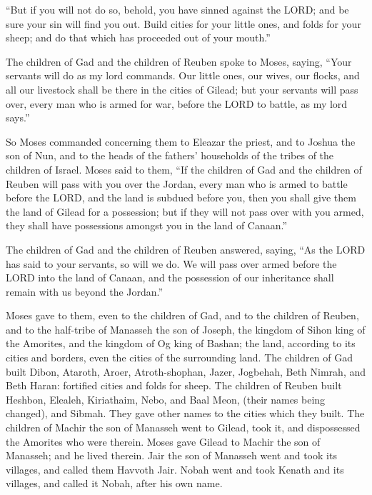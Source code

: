  ``But if you will not do so, behold, you have sinned
against the LORD; and be sure your sin will find you out. 
Build cities for your little ones, and folds for your sheep; and do that
which has proceeded out of your mouth.''

 The children of Gad and the children of Reuben spoke to
Moses, saying, ``Your servants will do as my lord commands.
 Our little ones, our wives, our flocks, and all our
livestock shall be there in the cities of Gilead;  but your
servants will pass over, every man who is armed for war, before the LORD
to battle, as my lord says.''

 So Moses commanded concerning them to Eleazar the priest,
and to Joshua the son of Nun, and to the heads of the fathers'
households of the tribes of the children of Israel.  Moses
said to them, ``If the children of Gad and the children of Reuben will
pass with you over the Jordan, every man who is armed to battle before
the LORD, and the land is subdued before you, then you shall give them
the land of Gilead for a possession;  but if they will not
pass over with you armed, they shall have possessions amongst you in the
land of Canaan.''

 The children of Gad and the children of Reuben answered,
saying, ``As the LORD has said to your servants, so will we do.
 We will pass over armed before the LORD into the land of
Canaan, and the possession of our inheritance shall remain with us
beyond the Jordan.''

 Moses gave to them, even to the children of Gad, and to
the children of Reuben, and to the half-tribe of Manasseh the son of
Joseph, the kingdom of Sihon king of the Amorites, and the kingdom of Og
king of Bashan; the land, according to its cities and borders, even the
cities of the surrounding land.  The children of Gad built
Dibon, Ataroth, Aroer,  Atroth-shophan, Jazer, Jogbehah,
 Beth Nimrah, and Beth Haran: fortified cities and folds
for sheep.  The children of Reuben built Heshbon, Elealeh,
Kiriathaim,  Nebo, and Baal Meon, (their names being
changed), and Sibmah. They gave other names to the cities which they
built.  The children of Machir the son of Manasseh went to
Gilead, took it, and dispossessed the Amorites who were therein.
 Moses gave Gilead to Machir the son of Manasseh; and he
lived therein.  Jair the son of Manasseh went and took its
villages, and called them Havvoth Jair.  Nobah went and
took Kenath and its villages, and called it Nobah, after his own name.

